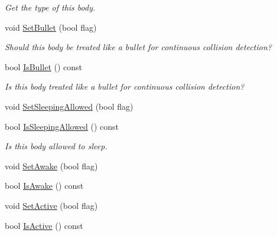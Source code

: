 \begin{DoxyCompactItemize}
\begin{DoxyCompactList}\small\item\em Get the type of this body. \end{DoxyCompactList}\item 
\hypertarget{classb2_body_a3253af3725b8d6d63d8223bcd2ddab5c}{void \hyperlink{classb2_body_a3253af3725b8d6d63d8223bcd2ddab5c}{Set\-Bullet} (bool flag)}\label{classb2_body_a3253af3725b8d6d63d8223bcd2ddab5c}

\begin{DoxyCompactList}\small\item\em Should this body be treated like a bullet for continuous collision detection? \end{DoxyCompactList}\item 
\hypertarget{classb2_body_af48509b43c9474b394cf76d733b56882}{bool \hyperlink{classb2_body_af48509b43c9474b394cf76d733b56882}{Is\-Bullet} () const }\label{classb2_body_af48509b43c9474b394cf76d733b56882}

\begin{DoxyCompactList}\small\item\em Is this body treated like a bullet for continuous collision detection? \end{DoxyCompactList}\item 
void \hyperlink{classb2_body_a229a6de228416203fecbf7a7544c33bb}{Set\-Sleeping\-Allowed} (bool flag)
\item 
\hypertarget{classb2_body_ac0b0c558008bda8cf7984dbaf2ee3aea}{bool \hyperlink{classb2_body_ac0b0c558008bda8cf7984dbaf2ee3aea}{Is\-Sleeping\-Allowed} () const }\label{classb2_body_ac0b0c558008bda8cf7984dbaf2ee3aea}

\begin{DoxyCompactList}\small\item\em Is this body allowed to sleep. \end{DoxyCompactList}\item 
void \hyperlink{classb2_body_ac72ed3df52a26c33db82252ab57399af}{Set\-Awake} (bool flag)
\item 
bool \hyperlink{classb2_body_aa28fdb95dffac89d20b04bd1a038b4ea}{Is\-Awake} () const 
\item 
void \hyperlink{classb2_body_ab8059b7b3e3b64aee17b54f68f7dde80}{Set\-Active} (bool flag)
\item 
\hypertarget{classb2_body_ae69b9cb7461ee165b6459ce43d648479}{bool \hyperlink{classb2_body_ae69b9cb7461ee165b6459ce43d648479}{Is\-Active} () const }\label{classb2_body_ae69b9cb7461ee165b6459ce43d648479}


\end{DoxyCompactItemize}
